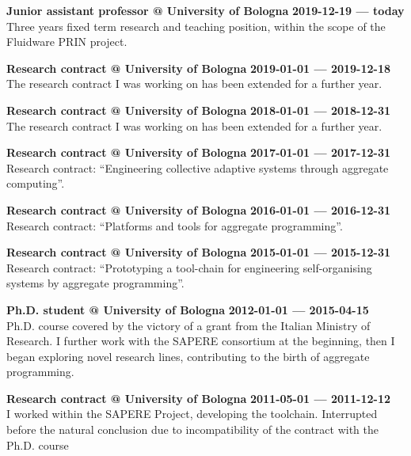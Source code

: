 \textbf{Junior assistant professor @ University of Bologna} \hfill \textbf{2019-12-19 --- today}\\
Three years fixed term research and teaching position,
within the scope of the Fluidware PRIN project.

\halfblankline{}

\textbf{Research contract @ University of Bologna} \hfill \textbf{2019-01-01 --- 2019-12-18}\\
The research contract I was working on has been extended for a further year.

\halfblankline{}

\textbf{Research contract @ University of Bologna} \hfill \textbf{2018-01-01 --- 2018-12-31}\\
The research contract I was working on has been extended for a further year.

\halfblankline{}

\textbf{Research contract @ University of Bologna} \hfill \textbf{2017-01-01 --- 2017-12-31}\\
Research contract: ``Engineering collective adaptive systems through aggregate computing''.

\halfblankline{}

\textbf{Research contract @ University of Bologna} \hfill \textbf{2016-01-01 --- 2016-12-31}\\
Research contract: ``Platforms and tools for aggregate programming''.

\halfblankline{}

\textbf{Research contract @ University of Bologna} \hfill \textbf{2015-01-01 --- 2015-12-31}\\
Research contract: ``Prototyping a tool-chain for engineering self-organising systems by aggregate programming''.

\halfblankline{}

\textbf{Ph.D. student @ University of Bologna} \hfill \textbf{2012-01-01 --- 2015-04-15}\\
Ph.D. course covered by the victory of a grant from the Italian Ministry of Research.
I further work with the SAPERE consortium at the beginning, then I began exploring novel research lines, contributing to the birth of aggregate programming.

\halfblankline{}

\textbf{Research contract @ University of Bologna} \hfill \textbf{2011-05-01 --- 2011-12-12}\\
I worked within the SAPERE Project, developing the toolchain.
Interrupted before the natural conclusion due to incompatibility of the contract with the Ph.D. course

